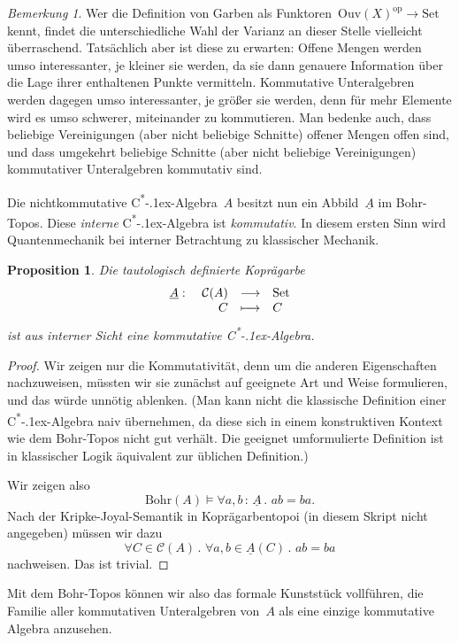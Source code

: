 \documentclass[a4paper,ngerman,12pt]{scrartcl}
\theoremstyle{definition}
\theoremstyle{plain}
\newtheorem{prop}[defn]{Proposition}
\theoremstyle{remark}
\newtheorem{bem}[defn]{Bemerkung}
\newcommand{\C}{\mathcal{C}}
\newcommand{\Ouv}{\mathrm{Ouv}}
\newcommand{\Bohr}{\mathrm{Bohr}}
\newcommand{\ul}[1]{\underline{#1}}
\newcommand{\csalgebra}{C\textsuperscript{*}\kern-.1ex-Algebra}
\newcommand{\op}{\mathrm{op}}
\newcommand{\Set}{\mathrm{Set}}
\renewcommand{\_}{\mathpunct{.}\,}
\newcommand{\?}{\,{:}\,}
\begin{document}
\begin{bem}Wer die Definition von Garben als Funktoren~$\Ouv(X)^\op \to \Set$
kennt, findet die unterschiedliche Wahl der Varianz an dieser Stelle vielleicht
überraschend. Tatsächlich aber ist diese zu erwarten: Offene Mengen werden umso
interessanter, je kleiner sie werden, da sie dann genauere Information über die
Lage ihrer enthaltenen Punkte vermitteln. Kommutative Unteralgebren werden
dagegen umso interessanter, je größer sie werden, denn für mehr Elemente wird
es umso schwerer, miteinander zu kommutieren. Man bedenke auch, dass
beliebige Vereinigungen (aber nicht beliebige Schnitte) offener Mengen offen
sind, und dass umgekehrt beliebige Schnitte (aber nicht beliebige
Vereinigungen) kommutativer Unteralgebren kommutativ sind.\end{bem}

Die nichtkommutative \csalgebra~$A$ besitzt nun ein Abbild~$\ul{A}$ im
Bohr-Topos. Diese \emph{interne} \csalgebra{} ist \emph{kommutativ}. In diesem
ersten Sinn wird Quantenmechanik bei interner Betrachtung zu klassischer
Mechanik.

\begin{prop}Die tautologisch definierte Koprägarbe
\[ \begin{array}{@{}rrcl@{}}
  \ul{A}:\ & \C(A) &\longrightarrow& \Set \\
  & C &\longmapsto& C
\end{array} \]
ist aus interner Sicht eine \emph{kommutative} \csalgebra.
\end{prop}
\begin{proof}Wir zeigen nur die Kommutativität, denn um die anderen
Eigenschaften nachzuweisen, müssten wir sie zunächst
auf geeignete Art und Weise formulieren, und das würde unnötig ablenken. (Man
kann nicht die klassische Definition einer \csalgebra{} naiv übernehmen, da
diese sich in einem konstruktiven Kontext wie dem Bohr-Topos nicht gut
verhält. Die geeignet umformulierte Definition ist in klassischer Logik
äquivalent zur üblichen Definition.)

Wir zeigen also
\[ \Bohr(A) \models \forall a,b\?\ul{A}\_ a b = b a. \]
Nach der Kripke-Joyal-Semantik in Koprägarbentopoi (in diesem Skript nicht
angegeben) müssen wir dazu
\[ \forall C \in \C(A)\_ \forall a,b \in \ul{A}(C)\_ a b = b a \]
nachweisen. Das ist trivial.\end{proof}

Mit dem Bohr-Topos können wir also das formale Kunststück vollführen, die
Familie aller kommutativen Unteralgebren von~$A$ als eine einzige kommutative
Algebra anzusehen.

\end{document}
